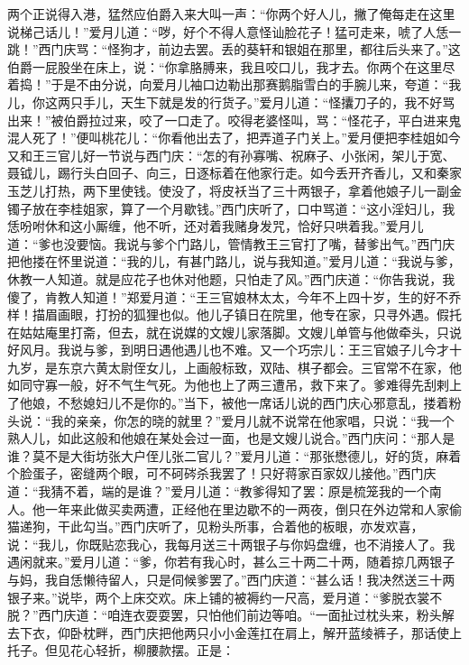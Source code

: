 两个正说得入港，猛然应伯爵入来大叫一声：“你两个好人儿，撇了俺每走在这里说梯己话儿！”爱月儿道：“哕，好个不得人意怪讪脸花子！猛可走来，唬了人恁一跳！”西门庆骂：“怪狗才，前边去罢。丢的葵轩和银姐在那里，都往后头来了。”这伯爵一屁股坐在床上，说：“你拿胳膊来，我且咬口儿，我才去。你两个在这里尽着捣！”于是不由分说，向爱月儿袖口边勒出那赛鹅脂雪白的手腕儿来，夸道：“我儿，你这两只手儿，天生下就是发\textMaoJi \textMaoBa 的行货子。”爱月儿道：“怪攮刀子的，我不好骂出来！”被伯爵拉过来，咬了一口走了。咬得老婆怪叫，骂：“怪花子，平白进来鬼混人死了！”便叫桃花儿：“你看他出去了，把弄道子门关上。”爱月便把李桂姐如今又和王三官儿好一节说与西门庆：“怎的有孙寡嘴、祝麻子、小张闲，架儿于宽、聂钺儿，踢行头白回子、向三，日逐标着在他家行走。如今丢开齐香儿，又和秦家玉芝儿打热，两下里使钱。使没了，将皮袄当了三十两银子，拿着他娘子儿一副金镯子放在李桂姐家，算了一个月歇钱。”西门庆听了，口中骂道：“这小淫妇儿，我恁吩咐休和这小厮缠，他不听，还对着我赌身发咒，恰好只哄着我。”爱月儿道：“爹也没要恼。我说与爹个门路儿，管情教王三官打了嘴，替爹出气。”西门庆把他搂在怀里说道：“我的儿，有甚门路儿，说与我知道。”爱月儿道：“我说与爹，休教一人知道。就是应花子也休对他题，只怕走了风。”西门庆道：“你告我说，我傻了，肯教人知道！”郑爱月道：“王三官娘林太太，今年不上四十岁，生的好不乔样！描眉画眼，打扮的狐狸也似。他儿子镇日在院里，他专在家，只寻外遇。假托在姑姑庵里打斋，但去，就在说媒的文嫂儿家落脚。文嫂儿单管与他做牵头，只说好风月。我说与爹，到明日遇他遇儿也不难。又一个巧宗儿：王三官娘子儿今才十九岁，是东京六黄太尉侄女儿，上画般标致，双陆、棋子都会。三官常不在家，他如同守寡一般，好不气生气死。为他也上了两三遭吊，救下来了。爹难得先刮剌上了他娘，不愁媳妇儿不是你的。”当下，被他一席话儿说的西门庆心邪意乱，搂着粉头说：“我的亲亲，你怎的晓的就里？”爱月儿就不说常在他家唱，只说：“我一个熟人儿，如此这般和他娘在某处会过一面，也是文嫂儿说合。”西门庆问：“那人是谁？莫不是大街坊张大户侄儿张二官儿？”爱月儿道：“那张懋德儿，好的货，麻着个脸蛋子，密缝两个眼，可不砢硶杀我罢了！只好蒋家百家奴儿接他。”西门庆道：“我猜不着，端的是谁？”爱月儿道：“教爹得知了罢：原是梳笼我的一个南人。他一年来此做买卖两遭，正经他在里边歇不的一两夜，倒只在外边常和人家偷猫递狗，干此勾当。”西门庆听了，见粉头所事，合着他的板眼，亦发欢喜，说：“我儿，你既贴恋我心，我每月送三十两银子与你妈盘缠，也不消接人了。我遇闲就来。”爱月儿道：“爹，你若有我心时，甚么三十两二十两，随着掠几两银子与妈，我自恁懒待留人，只是伺候爹罢了。”西门庆道：“甚么话！我决然送三十两银子来。”说毕，两个上床交欢。床上铺的被褥约一尺高，爱月道：“爹脱衣裳不脱？”西门庆道：“咱连衣耍耍罢，只怕他们前边等咱。“一面扯过枕头来，粉头解去下衣，仰卧枕畔，西门庆把他两只小小金莲扛在肩上，解开蓝绫裤子，那话使上托子。但见花心轻折，柳腰款摆。正是：

